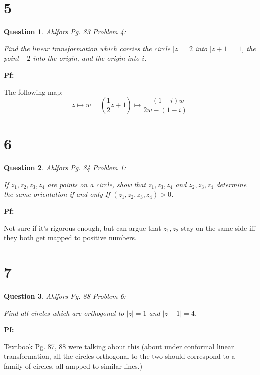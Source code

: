 \documentclass{article}
\newtheorem{question}{Question}
\begin{document}
\break

\section*{5}
\begin{myBox}[]{}
    \begin{question}
        Ahlfors Pg. 83 Problem 4:

        Find the linear transformation which carries the circle $|z|=2$ into $|z+1|=1$,
        the point $-2$ into the origin, and the origin into $i$.
    \end{question}
\end{myBox}

\textbf{Pf:}

The following map:
$$z\mapsto w=(\frac{1}{2}z+1)\mapsto \frac{-(1-i)w}{2w-(1-i)}$$

\break

\section*{6}
\begin{myBox}[]{}
    \begin{question}
        Ahlfors Pg. 84 Problem 1:

        If $z_1,z_2,z_3,z_4$ are points on a circle, show that $z_1,z_3,z_4$ and $z_2,z_3,z_4$ determine the same orientation if and only If
        $(z_1,z_2,z_3,z_4)>0$.
    \end{question}
\end{myBox}

\textbf{Pf:}

Not sure if it's rigorous enough, but can argue that $z_1,z_2$ stay on the same side iff they both get mapped to positive numbers.

\break

\section*{7}
\begin{myBox}[]{}
    \begin{question}
       Ahlfors Pg. 88 Problem 6:

       Find all circles which are orthogonal to $|z|=1$ and $|z-1|=4$.
    \end{question}
\end{myBox}

\textbf{Pf:}

Textbook Pg. 87, 88 were talking about this (about under conformal linear transformation, all the circles orthogonal to the two should correspond to a family of circles,
all ampped to similar lines.)
\end{document}

